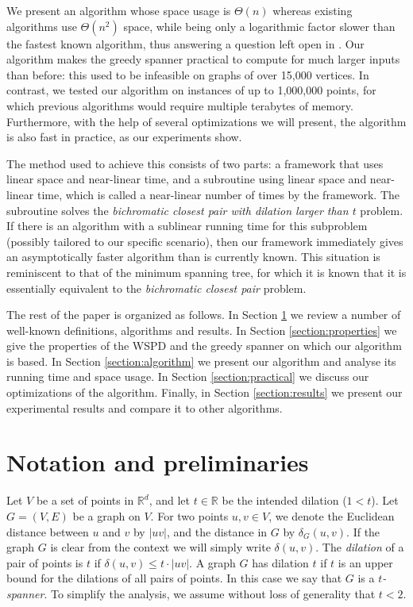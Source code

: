 \documentclass[runningheads,envcountsame,oribibl,orivec]{llncs}
\newcommand{\Reals}{\mathbb{R}}
\begin{document}
We present an algorithm whose space usage is $\Theta(n)$ whereas existing algorithms use $\Theta(n^2)$ space, while being only a logarithmic factor slower than the fastest known algorithm, thus answering a question left open in \cite{BoseCFMS2010}.
Our algorithm makes the greedy spanner practical to compute for much larger inputs than before: this used to be infeasible on graphs of over 15,000 vertices. In contrast, we tested our algorithm on instances of up to 1,000,000 points, for which previous algorithms would require multiple terabytes of memory. Furthermore, with the help of several optimizations we will present, the algorithm is also fast in practice, as our experiments show.

The method used to achieve this consists of two parts: a framework that uses linear space and near-linear time, and a subroutine using linear space and near-linear time, which is called a near-linear number of times by the framework. The subroutine solves the \emph{bichromatic closest pair with dilation larger than $t$} problem. If there is an algorithm with a sublinear running time for this subproblem (possibly tailored to our specific scenario), then our framework immediately gives an asymptotically faster algorithm than is currently known. This situation is reminiscent to that of the minimum spanning tree, for which it is known that it is essentially equivalent to the \emph{bichromatic closest pair} problem.

The rest of the paper is organized as follows. In Section \ref{section:preliminaries} we review a number of well-known definitions, algorithms and results. In Section \ref{section:properties} we give the properties of the WSPD and the greedy spanner on which our algorithm is based.
In Section \ref{section:algorithm} we present our algorithm and analyse its running time and space usage. In Section \ref{section:practical} we discuss our optimizations of the algorithm. Finally, in Section \ref{section:results} we present our experimental results and compare it to other algorithms.

\section{Notation and preliminaries} \label{section:preliminaries}

Let $V$ be a set of points in $\Reals^d$, and let $t \in \Reals$ be the intended dilation ($1 < t$). Let $G = (V, E)$ be a graph on $V$. For two points $u, v \in V$, we denote the Euclidean distance between $u$ and $v$ by $|uv|$, and the distance in $G$ by $\delta_G(u, v)$. If the graph $G$ is clear from the context we will simply write $\delta(u,v)$. The \emph{dilation} of a pair of points is $t$ if $\delta(u, v) \leq t \cdot |uv|$. A graph $G$ has dilation $t$ if $t$ is an upper bound for the dilations of all pairs of points. In this case we say that $G$ is a \emph{$t$-spanner}. To simplify the analysis, we assume without loss of generality that $t<2$.
\end{document}
